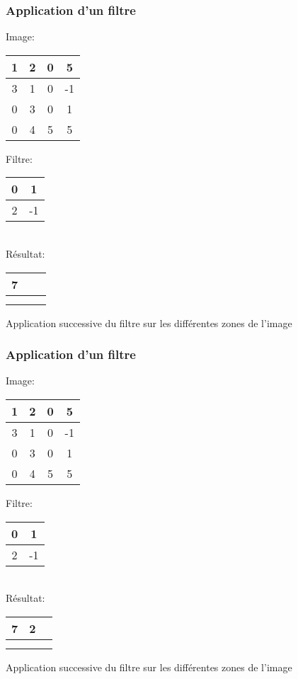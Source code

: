 \documentclass{formation}
\begin{document}
\begin{frame}
  \frametitle{Application d'un filtre}
  \begin{multicols}{2}
    Image:
    \begin{tabular}{|c|c|c|c|}
      \hline
      \cellcolor{green}1 & \cellcolor{green}2 & 0 & 5 \\
      \hline
      \cellcolor{green}3 & \cellcolor{green}1 & 0 & -1 \\
      \hline
      0 & 3 & 0 & 1 \\
      \hline
      0 & 4 & 5 & 5 \\
      \hline
    \end{tabular}

    \columnbreak

    Filtre:
    \begin{tabular}{|c|c|}
      \hline
      0 & 1  \\
      \hline
      2 & -1 \\
      \hline
    \end{tabular}\\[.5cm]
    Résultat:
    \begin{tabular}{|c|c|c|}
      \hline
      7 & \phantom{6} & \phantom{-2} \\
      \hline
       \phantom{-2}  &  & \\
      \hline
        &  & \\
      \hline
    \end{tabular}
  \end{multicols}
  Application successive du filtre sur les différentes zones de l'image
\end{frame}
\begin{frame}
  \frametitle{Application d'un filtre}
  \begin{multicols}{2}
    Image:
    \begin{tabular}{|c|c|c|c|}
      \hline
      1 & \cellcolor{green}2 & \cellcolor{green}0 & 5 \\
      \hline
      3 & \cellcolor{green}1 & \cellcolor{green}0 & -1 \\
      \hline
      0 & 3 & 0 & 1 \\
      \hline
      0 & 4 & 5 & 5 \\
      \hline
    \end{tabular}

    \columnbreak

    Filtre:
    \begin{tabular}{|c|c|}
      \hline
      0 & 1  \\
      \hline
      2 & -1 \\
      \hline
    \end{tabular}\\[.5cm]
    Résultat:
    \begin{tabular}{|c|c|c|}
      \hline
      7 & 2 & \phantom{-2} \\
      \hline
       \phantom{-2}  &  & \\
      \hline
        &  & \\
      \hline
    \end{tabular}
  \end{multicols}
  Application successive du filtre sur les différentes zones de l'image
\end{frame}
\end{document}
